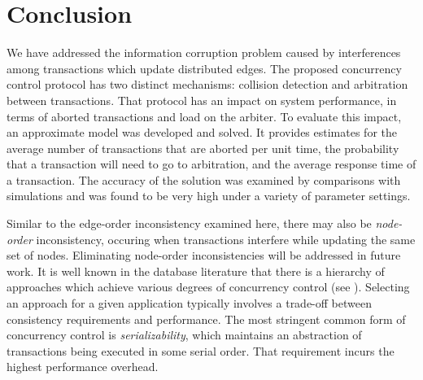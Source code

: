 \documentclass[runningheads]{llncs}
\begin{document}
\section{Conclusion}

We have addressed the information corruption problem caused by interferences
among transactions which update distributed edges. The proposed concurrency control
protocol has two distinct mechanisms: collision detection and
arbitration between transactions. That protocol has an impact on system performance,
in terms of aborted transactions and load on the arbiter. To evaluate this impact, an
approximate model was developed and solved. It provides estimates for the average
number of transactions that are aborted per unit time, the probability that a
transaction will need to go to arbitration, and the average response time of a
transaction. The accuracy of the solution was examined by comparisons with simulations
and was found to be very high under a variety of parameter settings.

Similar to the edge-order inconsistency examined here, there may also
be {\em node-order} inconsistency, occuring when transactions interfere
while updating the same set of nodes. Eliminating node-order inconsistencies
will be addressed in future work. It is well known in the database literature
that there is a hierarchy of approaches which achieve various degrees of
concurrency control (see \cite{ady}). Selecting an approach for a given
application typically involves a trade-off between consistency requirements
and performance. The most stringent common form of concurrency control is
{\em serializability}, which maintains an abstraction of transactions being
executed in some serial order. That requirement incurs the highest performance
overhead.
\end{document}
